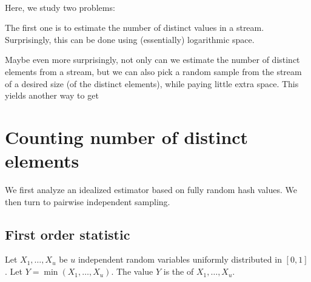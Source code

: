 %

       
\BookMode{\newpage}%

\noindent%



\noindent%
\ChapterPrefix{}%
\ChapterGen{}

~


\bigskip%


Here, we study two problems:
\begin{compactenumA}
    \smallskip%
    \item The first one is to estimate the number of distinct values in a
    stream. Surprisingly, this can be done using (essentially)
    logarithmic space.

    \smallskip%
    \item Maybe even more surprisingly, not only can we estimate the
    number of distinct elements from a stream, but we can also pick a
    random sample from the stream of a desired size (of the distinct
    elements), while paying little extra space. This yields another way
    to get
\end{compactenumA}


\section{Counting number of distinct elements}

We first analyze an idealized estimator based on fully random hash
values. We then turn to pairwise independent sampling.

\subsection{First order statistic}

Let $X_1, \ldots, X_u$ be $u$ independent random variables uniformly
distributed in $[0,1]$. Let $Y = \min (X_1, \ldots, X_u)$. The value $Y$ is
the  of
$X_1,\ldots, X_u$.


